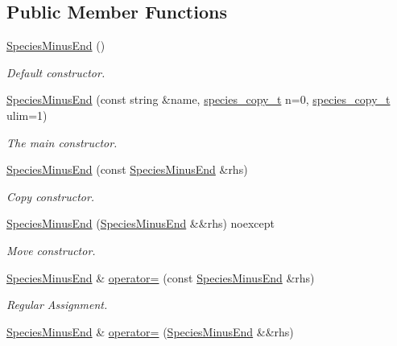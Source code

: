 \subsection*{Public Member Functions}
\begin{DoxyCompactItemize}
\item 
\hyperlink{classSpeciesMinusEnd_af0384659ba93d7aadc80d12059dc886f}{Species\+Minus\+End} ()
\begin{DoxyCompactList}\small\item\em Default constructor. \end{DoxyCompactList}\item 
\hyperlink{classSpeciesMinusEnd_a6268dec62372e99995729e9caa506af3}{Species\+Minus\+End} (const string \&name, \hyperlink{common_8h_a3503f321fd36304ee274141275cca586}{species\+\_\+copy\+\_\+t} n=0, \hyperlink{common_8h_a3503f321fd36304ee274141275cca586}{species\+\_\+copy\+\_\+t} ulim=1)
\begin{DoxyCompactList}\small\item\em The main constructor. \end{DoxyCompactList}\item 
\hyperlink{classSpeciesMinusEnd_a2b57190b7e3a2b8b31ed1beb56cec18b}{Species\+Minus\+End} (const \hyperlink{classSpeciesMinusEnd}{Species\+Minus\+End} \&rhs)
\begin{DoxyCompactList}\small\item\em Copy constructor. \end{DoxyCompactList}\item 
\hyperlink{classSpeciesMinusEnd_a077dd3c7539a2fdb25e75b972463831a}{Species\+Minus\+End} (\hyperlink{classSpeciesMinusEnd}{Species\+Minus\+End} \&\&rhs) noexcept
\begin{DoxyCompactList}\small\item\em Move constructor. \end{DoxyCompactList}\item 
\hyperlink{classSpeciesMinusEnd}{Species\+Minus\+End} \& \hyperlink{classSpeciesMinusEnd_a290ec2836fff00bb8fa734b3593a7023}{operator=} (const \hyperlink{classSpeciesMinusEnd}{Species\+Minus\+End} \&rhs)
\begin{DoxyCompactList}\small\item\em Regular Assignment. \end{DoxyCompactList}\item 
\hyperlink{classSpeciesMinusEnd}{Species\+Minus\+End} \& \hyperlink{classSpeciesMinusEnd_a0220f15a2fd8e07510f5e02c8f8fc0fe}{operator=} (\hyperlink{classSpeciesMinusEnd}{Species\+Minus\+End} \&\&rhs)

\end{DoxyCompactItemize}
